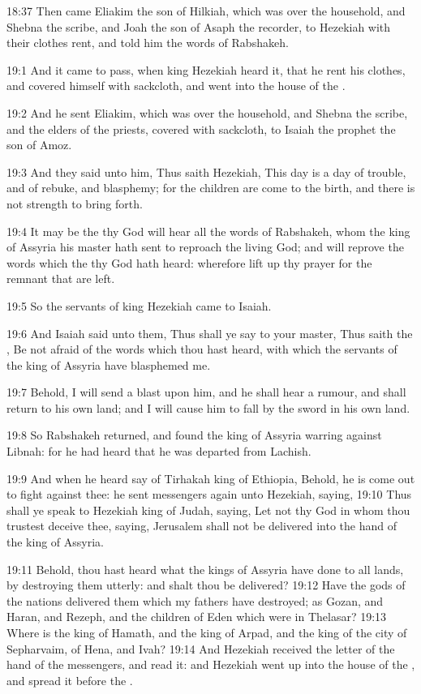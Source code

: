 18:37 Then came Eliakim the son of Hilkiah, which was over the household, and Shebna the scribe, and Joah the son of Asaph the recorder, to Hezekiah with their clothes rent, and told him the words of Rabshakeh.

19:1 And it came to pass, when king Hezekiah heard it, that he rent his clothes, and covered himself with sackcloth, and went into the house of the \LORD.

19:2 And he sent Eliakim, which was over the household, and Shebna the scribe, and the elders of the priests, covered with sackcloth, to Isaiah the prophet the son of Amoz.

19:3 And they said unto him, Thus saith Hezekiah, This day is a day of trouble, and of rebuke, and blasphemy; for the children are come to the birth, and there is not strength to bring forth.

19:4 It may be the \LORD thy God will hear all the words of Rabshakeh, whom the king of Assyria his master hath sent to reproach the living God; and will reprove the words which the \LORD thy God hath heard: wherefore lift up thy prayer for the remnant that are left.

19:5 So the servants of king Hezekiah came to Isaiah.

19:6 And Isaiah said unto them, Thus shall ye say to your master, Thus saith the \LORD, Be not afraid of the words which thou hast heard, with which the servants of the king of Assyria have blasphemed me.

19:7 Behold, I will send a blast upon him, and he shall hear a rumour, and shall return to his own land; and I will cause him to fall by the sword in his own land.

19:8 So Rabshakeh returned, and found the king of Assyria warring against Libnah: for he had heard that he was departed from Lachish.

19:9 And when he heard say of Tirhakah king of Ethiopia, Behold, he is come out to fight against thee: he sent messengers again unto Hezekiah, saying, 19:10 Thus shall ye speak to Hezekiah king of Judah, saying, Let not thy God in whom thou trustest deceive thee, saying, Jerusalem shall not be delivered into the hand of the king of Assyria.

19:11 Behold, thou hast heard what the kings of Assyria have done to all lands, by destroying them utterly: and shalt thou be delivered?  19:12 Have the gods of the nations delivered them which my fathers have destroyed; as Gozan, and Haran, and Rezeph, and the children of Eden which were in Thelasar?  19:13 Where is the king of Hamath, and the king of Arpad, and the king of the city of Sepharvaim, of Hena, and Ivah?  19:14 And Hezekiah received the letter of the hand of the messengers, and read it: and Hezekiah went up into the house of the \LORD, and spread it before the \LORD.

